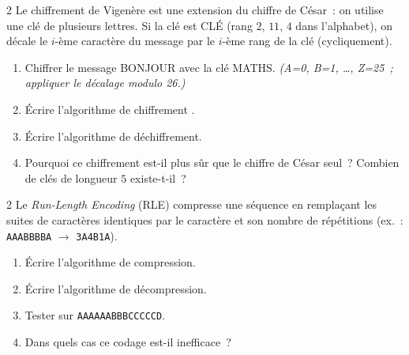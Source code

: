 \begin{probleme}{2}
Le chiffrement de Vigen\`ere est une extension du chiffre de C\'esar~: on
utilise une cl\'e de plusieurs lettres. Si la cl\'e est \og CLÉ\fg{} (rang
$2$, $11$, $4$ dans l'alphabet), on d\'ecale le $i$-\`eme caract\`ere
du message par le $i$-\`eme rang de la cl\'e (cycliquement).
\begin{enumerate}
  \item Chiffrer le message \og BONJOUR\fg{} avec la cl\'e \og MATHS\fg.
        \emph{(A=0, B=1, \ldots, Z=25~; appliquer le d\'ecalage modulo 26.)}
  \item \'Ecrire l'algorithme de chiffrement \computer.
  \item \'Ecrire l'algorithme de d\'echiffrement.
  \item Pourquoi ce chiffrement est-il plus s\^ur que le chiffre de C\'esar seul~?
        Combien de cl\'es de longueur $5$ existe-t-il~?
\end{enumerate}
\end{probleme}

\begin{probleme}{2}
Le \emph{Run-Length Encoding} (RLE) compresse une s\'equence en
remplaçant les suites de caract\`eres identiques par le caract\`ere
et son nombre de r\'ep\'etitions (ex.~: \texttt{AAABBBBA} $\to$
\texttt{3A4B1A}).
\begin{enumerate}
  \item \'Ecrire l'algorithme de compression.
  \item \'Ecrire l'algorithme de d\'ecompression.
  \item Tester sur \texttt{AAAAAABBBCCCCCD}.
  \item Dans quels cas ce codage est-il inefficace~?
\end{enumerate}
\end{probleme}


